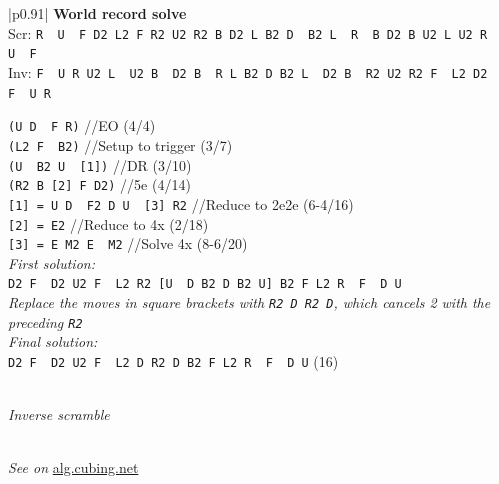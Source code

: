 \documentclass[11pt,a4paper]{book}
\newcommand{\p}{\textquotesingle}
\newcommand{\m}{\texttt}
\newcommand{\ps}{\p\,\,}
\newcommand{\comment}[1]{{\color{gray}\quad//#1}}
\begin{document}
\bigskip
\begin{tabular}{|p{}|}
\hline
\textbf{World record solve}\\
\hline
Scr: \m{R\ps U\ps F D2 L2 F R2 U2 R2 B D2 L B2 D\ps B2 L\ps R\ps B D2 B U2 L U2 R\ps U\ps F}\\
Inv: \m{F\ps U R U2 L\ps U2 B\ps D2 B\ps R L B2 D B2 L\ps D2 B\ps R2 U2 R2 F\ps L2 D2 F\ps U R}\\
\hline
\begin{minipage}[l]{0.70\textwidth}
\m{(U D\ps F R)} \comment{EO (4/4)}\\
\m{(L2 F\ps B2)} \comment{Setup to trigger (3/7)}\\
\m{(U\ps B2 U\ps [1])} \comment{DR (3/10)}\\
\m{(R2 B [2] F D2)} \comment{5e (4/14)}\\

\m{[1] = U D\ps F2 D U\ps [3] R2} \comment{Reduce to 2e2e (6-4/16)}\\
\m{[2] = E2} \comment{Reduce to 4x (2/18)}\\
\m{[3] = E M2 E\ps M2} \comment{Solve 4x (8-6/20)}\\

\emph{First solution:}\\
\m{D2 F\ps D2 U2 F\ps L2 R2 {[U\ps D B2 D B2 U]} B2 F L2 R\ps F\ps D U\p}\\
\emph{Replace the moves in square brackets with \m{R2 D R2 D}, which cancels 2 with the preceding \m{R2}}\\

\emph{Final solution:}\\
\m{D2 F\ps D2 U2 F\ps L2 D R2 D B2 F L2 R\ps F\ps D U\p} (16)\\
\end{minipage}
\begin{minipage}[c]{0.2\textwidth}
{\begin{center}\\ \emph{Inverse scramble}
\end{center}}
\end{minipage}\\
\hline
\emph{See on }\href{https://alg.cubing.net/?alg=R-_F-_B_L-_\%2F\%2FEO_(4\%2F4)\%0AD2_F_\%2F\%2FSimplify_(2\%2F6)\%0AD-_B2_D-_B-_\%2F\%2FDR_(4\%2F10)\%0AD_L2_B2_\%2F\%2FCorner_bars_(3\%2F13)\%0AU-_L2_U_D_F2_D-_U_\%2F\%2F3e_(7\%2F20)&setup=R-_U-_F__U2_B2_L__D2_B2_L-_D2_F2_R-_F2_L__U-_R__B__F2_L-_R2_U-_R__U__B__R-_U-_F}{alg.cubing.net}\\
\hline
\end{tabular}
\bigskip
\end{document}
